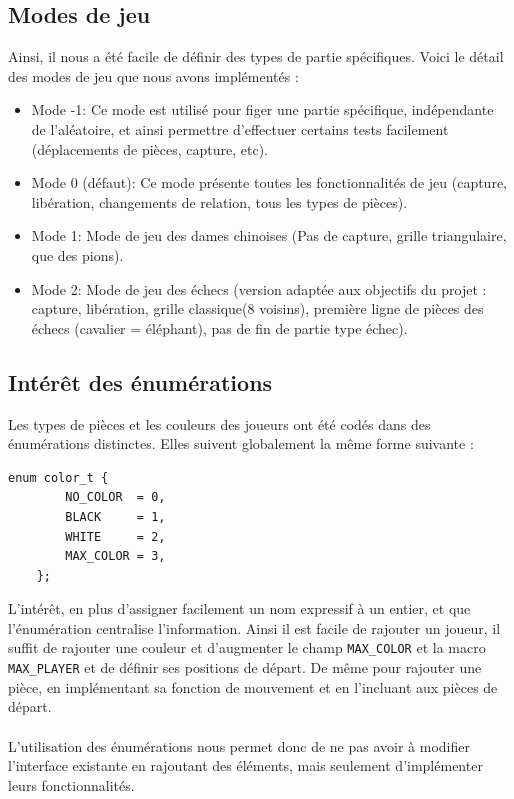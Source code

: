 \documentclass{article}
\begin{document}
\subsection{Modes de jeu}
Ainsi, il nous a été facile de définir des types de partie spécifiques. Voici le détail des modes de jeu que nous avons implémentés :
\newline
\begin{itemize}
    \item Mode -1: Ce mode est utilisé pour figer une partie spécifique, indépendante de l'aléatoire, et ainsi permettre d'effectuer certains tests
    facilement (déplacements de pièces, capture, etc).
    \newline
    \item Mode 0 (défaut): Ce mode présente toutes les fonctionnalités de jeu (capture, libération, changements de relation, tous les types de pièces).
    \newline
    \item Mode 1: Mode de jeu des dames chinoises (Pas de capture, grille triangulaire, que des pions).
    \newline
    \item Mode 2: Mode de jeu des échecs (version adaptée aux objectifs du projet :  capture, libération, grille classique(8 voisins), première ligne de pièces des échecs (cavalier = éléphant), pas de fin de partie type échec).
\end{itemize}

\vspace{3cm}
\subsection{Intérêt des énumérations}
Les types de pièces et les couleurs des joueurs ont été codés dans des énumérations distinctes. Elles suivent globalement la même forme suivante :
\\
\begin{lstlisting}[caption=Exemple d'énumération]
    enum color_t {
        NO_COLOR  = 0,  
        BLACK     = 1,
        WHITE     = 2,
        MAX_COLOR = 3,
    };
\end{lstlisting}
L'intérêt, en plus d'assigner facilement un nom expressif à un entier, et que l'énumération centralise l'information. Ainsi il est facile de rajouter un joueur,
il suffit de rajouter une couleur et d'augmenter le champ \lstinline{MAX_COLOR} et la macro \lstinline{MAX_PLAYER} et de définir ses positions de départ.
De même pour rajouter une pièce, en implémentant sa fonction de mouvement et en l'incluant aux pièces de départ.
\\\\
L'utilisation des énumérations nous permet donc de ne pas avoir à modifier l'interface existante en rajoutant des éléments, mais seulement
d'implémenter leurs fonctionnalités.
\end{document}
